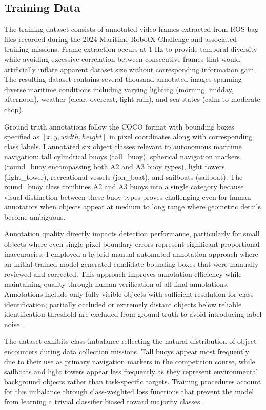 \documentclass{erauthesis}
\begin{document}
\subsection{Training Data} \label{sec:yolo_training data}

The training dataset consists of annotated video frames extracted from ROS bag files recorded during the 2024 Maritime RobotX Challenge and associated training missions.
Frame extraction occurs at 1 Hz to provide temporal diversity while avoiding excessive correlation between consecutive frames that would artificially inflate apparent dataset size without corresponding information gain.
The resulting dataset contains several thousand annotated images spanning diverse maritime conditions including varying lighting (morning, midday, afternoon), weather (clear, overcast, light rain), and sea states (calm to moderate chop).

Ground truth annotations follow the COCO format with bounding boxes specified as $[x, y, width, height]$ in pixel coordinates along with corresponding class labels.
I annotated six object classes relevant to autonomous maritime navigation: tall cylindrical buoys (tall\_buoy), spherical navigation markers (round\_buoy encompassing both A2 and A3 buoy types), light towers (light\_tower), recreational vessels (jon\_boat), and sailboats (sailboat).
The round\_buoy class combines A2 and A3 buoys into a single category because visual distinction between these buoy types proves challenging even for human annotators when objects appear at medium to long range where geometric details become ambiguous.

Annotation quality directly impacts detection performance, particularly for small objects where even single-pixel boundary errors represent significant proportional inaccuracies.
I employed a hybrid manual-automated annotation approach where an initial trained model generated candidate bounding boxes that were manually reviewed and corrected.
This approach improves annotation efficiency while maintaining quality through human verification of all final annotations.
Annotations include only fully visible objects with sufficient resolution for class identification; partially occluded or extremely distant objects below reliable identification threshold are excluded from ground truth to avoid introducing label noise.

The dataset exhibits class imbalance reflecting the natural distribution of object encounters during data collection missions.
Tall buoys appear most frequently due to their use as primary navigation markers in the competition course, while sailboats and light towers appear less frequently as they represent environmental background objects rather than task-specific targets.
Training procedures account for this imbalance through class-weighted loss functions that prevent the model from learning a trivial classifier biased toward majority classes.
\end{document}
